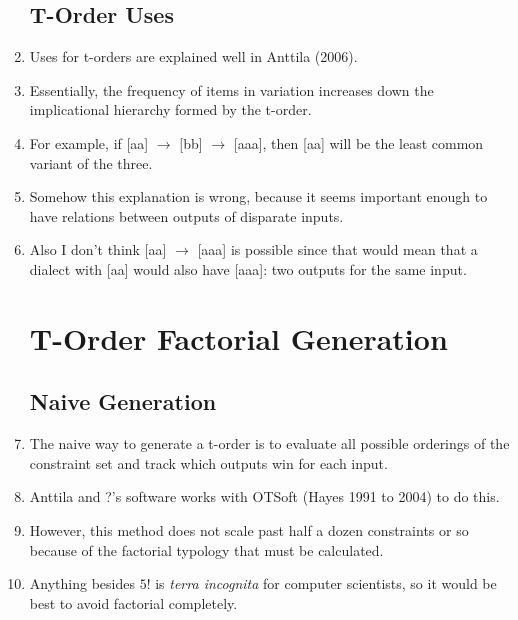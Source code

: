 \documentclass[11pt]{article}
\begin{document}
\begin{enumerate}
\subsection{T-Order Uses}
\item Uses for t-orders are explained well in Anttila (2006).
\item Essentially, the frequency of items in variation increases down the
  implicational hierarchy formed by the t-order.
\item For example, if [aa] $\to$ [bb] $\to$ [aaa], then [aa] will be
  the least common variant of the three.
\item Somehow this explanation is wrong, because it seems important enough
  to have relations between outputs of disparate inputs.
\item Also I don't think [aa] $\to$ [aaa] is possible since that would mean that
  a dialect with [aa] would also have [aaa]: two outputs for the same input.
  \section{T-Order Factorial Generation}
\subsection{Naive Generation}
\item The naive way to generate a t-order is to evaluate all possible orderings
  of the constraint set and track which outputs win for each input.
\item Anttila and ?'s software works with OTSoft (Hayes 1991 to 2004) to do this.
\item However, this method does not scale past half a dozen constraints or so
  because of the factorial typology that must be calculated.
\item Anything besides $5!$ is {\it terra incognita} for computer
  scientists, so it would be best to avoid factorial completely.

\end{enumerate}
\end{document}
